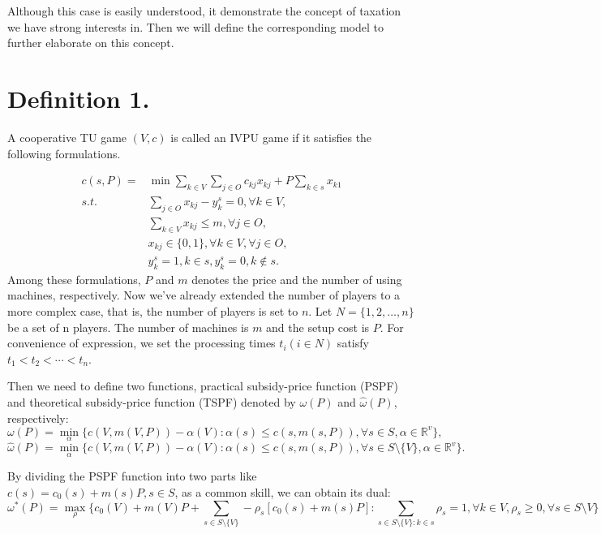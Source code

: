 \documentclass[UTF8]{article}
\begin{document}
Although this case is easily understood, it demonstrate the concept of taxation we have strong interests in. Then we will define the corresponding model to further elaborate on this concept.

\section*{Definition 1.}

A cooperative TU game $(V,c)$ is called an IVPU game if it satisfies the following formulations.

\[
\begin{aligned}
c(s,P) = & {\min} \sum_{k\in V}\sum_{j\in O} {c_{kj} x_{kj}} + {P\sum_{k\in s} x_{k1}} \\
{s.t.}\quad & \sum_{j \in O} x_{kj}-y_k^s=0, \forall k \in V, \\
& \sum_{k\in V} x_{kj} \leq m,\forall j \in O,  \\
& x_{kj} \in \{0,1\} , \forall k \in V, \forall j \in O,\\
& y_k^s=1, k \in s, y_k^s=0, k \notin s.
\end{aligned}
\]
Among these formulations, $P$ and $m$ denotes the price and the number of using machines, respectively.
Now we've already extended the number of players to a more complex case, that is, the number of players is set to $n$.
Let $N=\{1,2,\ldots,n\}$ be a set of n players. The number of machines is $m$ and the setup cost is $P$.
For convenience of expression, we set the processing times $t_i(i\in N)$ satisfy $t_1<t_2<\cdots<t_n$.

Then we need to define two functions, practical subsidy-price function (PSPF) and theoretical subsidy-price function (TSPF) denoted by $\omega(P)$ and $\hat{\omega}(P)$, respectively:
\[
  {\omega(P)}=\mathop{\min}_{\alpha}\{c(V,m(V,P))-\alpha(V): \alpha(s)\leq c(s,m(s,P))
 ,\forall s \in S, \alpha\in\mathbb{R}^{v}\},
\]
\[
  {\hat{\omega}(P)}=\mathop{\min}_{\alpha}\{c(V,m(V,P))-\alpha(V): \alpha(s)\leq c(s,m(s,P))
 ,\forall s \in S\setminus\{V\}, \alpha\in\mathbb{R}^{v}\}.
\]

By dividing the PSPF function into two parts like $c(s)=c_0(s)+m(s)P, s \in S$, as a common skill, we can obtain its dual:
\begin{equation}\label{dual}
 {\omega^*(P)}=\mathop{\max}_{\rho} \{c_0(V)+m(V)P+\sum_{s\in S\setminus\{V\}}-\rho_s[c_0(s)+m(s)P]:
 \sum_{s\in S\setminus\{V\}:k\in s}\rho_s=1,\forall k \in V,\rho_s\geq 0,\forall s \in S \setminus{V}\}
\end{equation}
\end{document}
